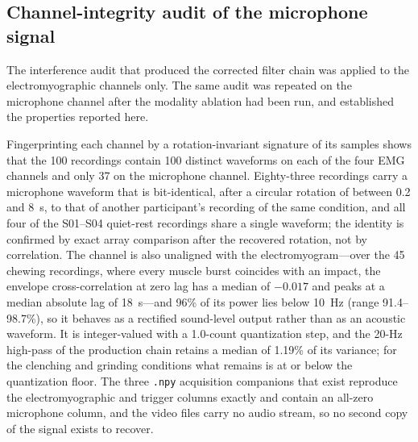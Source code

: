 \documentclass[pdflatex,sn-nature,iicol]{sn-jnl}
\begin{document}
\subsection{Channel-integrity audit of the microphone signal}
\label{sec:mic_defect}

The interference audit that produced the corrected filter chain was applied to the electromyographic channels only. The same audit was repeated on the microphone channel after the modality ablation had been run, and established the properties reported here.

Fingerprinting each channel by a rotation-invariant signature of its samples shows that the 100 recordings contain 100 distinct waveforms on each of the four EMG channels and only 37 on the microphone channel. Eighty-three recordings carry a microphone waveform that is bit-identical, after a circular rotation of between 0.2 and 8~s, to that of another participant's recording of the same condition, and all four of the S01--S04 quiet-rest recordings share a single waveform; the identity is confirmed by exact array comparison after the recovered rotation, not by correlation. The channel is also unaligned with the electromyogram---over the 45 chewing recordings, where every muscle burst coincides with an impact, the envelope cross-correlation at zero lag has a median of $-0.017$ and peaks at a median absolute lag of 18~s---and 96\% of its power lies below 10~Hz (range 91.4--98.7\%), so it behaves as a rectified sound-level output rather than as an acoustic waveform. It is integer-valued with a 1.0-count quantization step, and the 20-Hz high-pass of the production chain retains a median of 1.19\% of its variance; for the clenching and grinding conditions what remains is at or below the quantization floor. The three \texttt{.npy} acquisition companions that exist reproduce the electromyographic and trigger columns exactly and contain an all-zero microphone column, and the video files carry no audio stream, so no second copy of the signal exists to recover.
\end{document}

